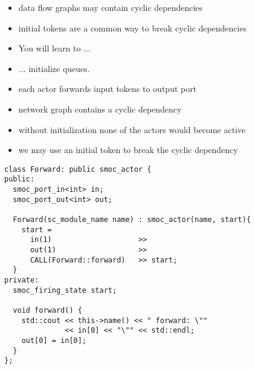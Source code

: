 \begin{frame}
\begin{itemize}
\item data flow graphs may contain cyclic dependencies
\item initial tokens are a common way to break cyclic dependencies
\end{itemize}
\begin{itemize}
\item You will learn to ...
\item ... initialize queues.
\end{itemize}
\end{frame}


\begin{frame}
\begin{figure}
\centering
\resizebox{0.9\columnwidth}{!}{}
\end{figure}
\begin{itemize}
\item each actor forwards input tokens to output port
\item network graph contains a cyclic dependency
\item without initialization none of the actors would become active
\item we may use an initial token to break the cyclic dependency
\end{itemize}
\end{frame}





\begin{frame}[fragile=singleslide]
\begin{lstlisting}
class Forward: public smoc_actor {
public:
  smoc_port_in<int> in;
  smoc_port_out<int> out;

  Forward(sc_module_name name) : smoc_actor(name, start){
    start = 
      in(1)                    >>
      out(1)                   >>
      CALL(Forward::forward)   >> start;
  }
private:
  smoc_firing_state start;

  void forward() {
    std::cout << this->name() << " forward: \""
              << in[0] << "\"" << std::endl;
    out[0] = in[0];
  }
};
\end{lstlisting}
\end{frame}





